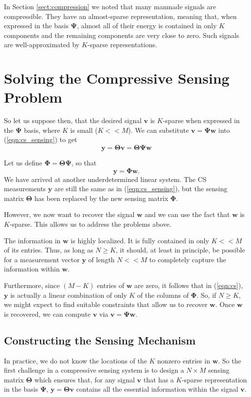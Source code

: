 In Section \ref{sect:compression} we noted that many manmade signals are compressible.
They have an almost-sparse representation, meaning that, when expressed in the basis $\bm\Psi$, almost all of their energy is contained in only $K$ components and the remaining components are very close to zero.
Such signals are well-approximated by $K$-sparse representations.

\section{Solving the Compressive Sensing Problem}
So let us suppose then, that the desired signal $\bm v$ is $K$-sparse when expressed in the $\bm\Psi$ basis, where $K$ is 
small ($K << M$).
We can substitute $\bm v = \bm\Psi\bm w$ into (\ref{eqn:cs_sensing}) to get
\begin{equation*}
  \bm y = \bm\Theta\bm v = \bm\Theta\bm\Psi\bm w
\end{equation*}

Let us define $\bm\Phi = \bm\Theta\bm\Psi$, so that
\begin{equation}
  \label{eqn:cs}
  \bm y = \bm\Phi\bm w .
\end{equation}
We have arrived at another underdetermined linear system.
The CS measurements $\bm y$ are still the same as in (\ref{eqn:cs_sensing}), but the sensing matrix $\bm\Theta$ has been replaced by the new sensing matrix $\bm\Phi$.

However, we now want to recover the signal $\bm w$ and we can use the fact that $\bm w$ is $K$-sparse.
This allows us to address the problems above.

The information in $\bm w$ is highly localized.
It is fully contained in only $K << M$ of its entries.
Thus, as long as $N\geq K$, it should, at least in principle, be possible for a measurement vector $\bm y$ of length $N<<M$ to completely capture the information within $\bm w$.

Furthermore, since $(M-K)$ entries of $\bm w$ are zero, it follows that in (\ref{eqn:cs}), $\bm y$ is actually a linear combination of only $K$ of the columns of $\bm\Phi$. 
So, if $N\geq K$, we might expect to find suitable constraints that allow us to recover $\bm w$.
Once $\bm w$ is recovered, we can compute $\bm v$ via $\bm v = \bm\Psi\bm w$.

\subsection{Constructing the Sensing Mechanism}
\label{sect:sensors}
In practice, we do not know the locations of the $K$ nonzero entries in $\bm w$.
So the first challenge in a compressive sensing system is to design a $N\times M$ sensing matrix $\bm\Theta$ which ensures that, for any signal $\bm v$ that has a $K$-sparse representation in the basis $\bm\Psi$, $\bm y=\bm\Theta\bm v$ contains all the essential information within the signal $\bm v$.

